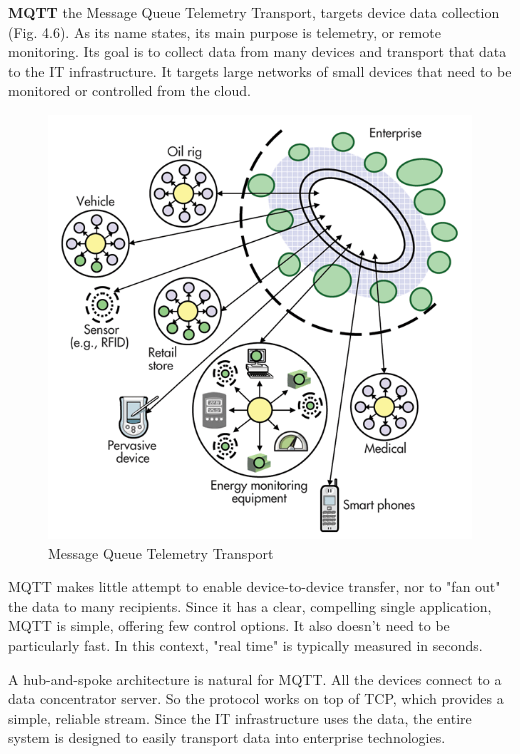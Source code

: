       \textbf{MQTT}
      \newline
      the Message Queue Telemetry Transport, targets device data collection (Fig. 4.6). As its name states, its main purpose is telemetry, or remote monitoring. Its goal is to collect data from many devices and transport that data to the IT infrastructure. It targets large networks of small devices that need to be monitored or controlled from the cloud.
      \begin{figure}[!ht]
      \centering
      \includegraphics[scale=0.6]{images/MQTT.png}   
      \caption[Message Queue Telemetry Transport]{Message Queue Telemetry Transport}
      \label{img:MQTT}                           
      \end{figure}
      MQTT makes little attempt to enable device-to-device transfer, nor to "fan out" the data to many recipients. Since it has a clear, compelling single application, MQTT is simple, offering few control options. It also doesn’t need to be particularly fast. In this context, "real time" is typically measured in seconds.

      A hub-and-spoke architecture is natural for MQTT. All the devices connect to a data concentrator server. So the protocol works on top of TCP, which provides a simple, reliable stream. Since the IT infrastructure uses the data, the entire system is designed to easily transport data into enterprise technologies.


